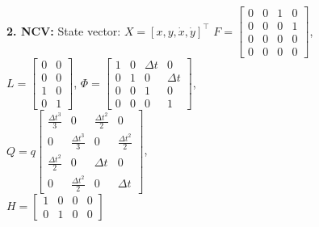 \documentclass[9pt]{IEEEtran}
\begin{document}
\textbf{2. NCV:}
State vector: $X = [x,  y,\dot{x},\dot{y}]^\top$ 
$F = \begin{bmatrix} 0 & 0 & 1 & 0 \\ 0 & 0 & 0 & 1 \\ 0 & 0 & 0 & 0 \\ 0 & 0 & 0 & 0 \end{bmatrix}$, \\
$L = \begin{bmatrix} 0 & 0 \\ 0 & 0 \\ 1 & 0 \\ 0 & 1 \end{bmatrix}$, 
$ \Phi = \begin{bmatrix} 1 & 0 & \Delta t & 0  \\ 0 & 1 & 0 & \Delta t  
  \\ 0 & 0 & 1 & 0  \\ 0 & 0 & 0 & 1  \end{bmatrix}$, \\
$ Q = q \begin{bmatrix} \frac{\Delta t^3}{3} &  0 &\frac{\Delta t^2}{2}& 0  \\  
  0 & \frac{\Delta t^3}{3} & 0 & \frac{\Delta t^2}{2}  \\ 
  \frac{\Delta t^2}{2} & 0 & \Delta t & 0  \\ 
  0  & \frac{\Delta t^2}{2} & 0 & \Delta t 
\end{bmatrix}$, \\
$ H = \begin{bmatrix} 1 & 0 & 0 & 0 \\ 0 & 1 & 0 & 0 \end{bmatrix}$ \\
\end{document}
